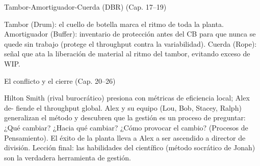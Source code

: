 \begin{definicion}{Tambor-Amortiguador-Cuerda (DBR) (Cap. 17–19)}

   Tambor (Drum): el cuello de botella marca el ritmo de toda la planta.
   Amortiguador (Buffer): inventario de protección antes del CB para que nunca se
   quede sin trabajo (protege el throughput contra la variabilidad).
   Cuerda (Rope): señal que ata la liberación de material al ritmo del tambor, evitando
   exceso de WIP.

\end{definicion}

\begin{definicion}{El conflicto y el cierre (Cap. 20–26)}

   Hilton Smith (rival burocrático) presiona con métricas de eficiencia local; Alex de-
   fiende el throughput global.
   Alex y su equipo (Lou, Bob, Stacey, Ralph) generalizan el método y descubren que
   la gestión es un proceso de preguntar: ¿Qué cambiar? ¿Hacia qué cambiar? ¿Cómo
   provocar el cambio? (Procesos de Pensamiento).
   El éxito de la planta lleva a Alex a ser ascendido a director de división.
   Lección final: las habilidades del científico (método socrático de Jonah) son la
   verdadera herramienta de gestión.


\end{definicion}


